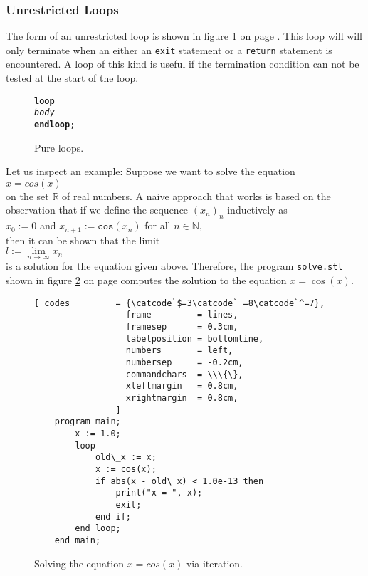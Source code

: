 \subsubsection{Unrestricted Loops}
The form of an unrestricted loop is shown in figure \ref{fig:loop} on page
\pageref{fig:loop}.  This loop will will only terminate when an either an \texttt{exit}
statement or a \texttt{return} statement is encountered.
A loop of this kind is useful if the termination condition can not be tested at the start
of the loop.

\begin{figure}[!ht]
  \centering
\begin{alltt}
      \textbf{loop}
          \textsl{body}
      \textbf{end loop};
\end{alltt}
\vspace*{-0.3cm}
\caption{Pure loops.}  \label{fig:loop}
\end{figure} 

Let us inspect an example:
Suppose we want to solve the equation
 \\[0.2cm]
\hspace*{1.3cm} $x = cos(x)$ \\[0.2cm]
on the set $\mathbb{R}$ of real numbers.
A naive approach that works is based on the observation that if we define the
 sequence  $(x_n)_n$ inductively as  \\[0.2cm]
\hspace*{1.3cm} $x_0 := 0$ and $x_{n+1} := \mathtt{cos}(x_n)$ for all $n \in \mathbb{N}$, 
\\[0.2cm]
then it can be shown that the limit
\\[0.2cm]
\hspace*{1.3cm}
$l := \lim\limits_{n \rightarrow \infty} x_n$
\\[0.2cm]
is a solution for the equation given above.
Therefore, the program \texttt{solve.stl} shown in figure
 \ref{fig:solve.stl} on page \pageref{fig:solve.stl} computes the solution to the equation
 $x = \cos(x)$.

\begin{figure}[!ht]
  \centering
\begin{Verbatim}[ codes         = {\catcode`$=3\catcode`_=8\catcode`^=7},
                  frame         = lines, 
                  framesep      = 0.3cm, 
                  labelposition = bottomline,
                  numbers       = left,
                  numbersep     = -0.2cm,
                  commandchars  = \\\{\},
                  xleftmargin   = 0.8cm,
                  xrightmargin  = 0.8cm,
                ]
    program main;
        x := 1.0;
        loop
            old\_x := x;
            x := cos(x);
            if abs(x - old\_x) < 1.0e-13 then
                print("x = ", x);
                exit;
            end if;
        end loop;
    end main;
\end{Verbatim} 
\vspace*{-0.3cm}
\caption{Solving the equation $x = cos(x)$ via iteration.}  \label{fig:solve.stl}
\end{figure} %

